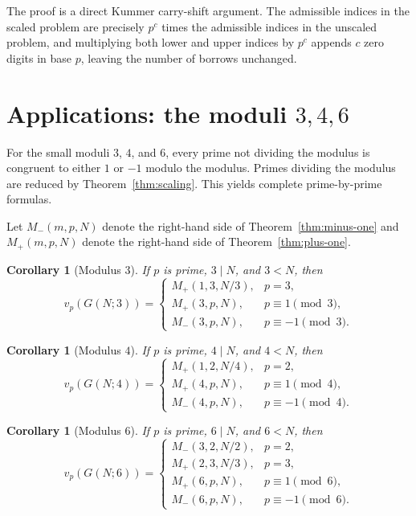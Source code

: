 \documentclass[11pt]{article}
\newtheorem{corollary}[theorem]{Corollary}
\begin{document}
The proof is a direct Kummer carry-shift argument.  The admissible indices in the
scaled problem are precisely $p^c$ times the admissible indices in the unscaled
problem, and multiplying both lower and upper indices by $p^c$ appends $c$ zero
digits in base $p$, leaving the number of borrows unchanged.

\section{Applications: the moduli \texorpdfstring{$3,4,6$}{3,4,6}}\label{sec:small}

For the small moduli $3$, $4$, and $6$, every prime not dividing the modulus is
congruent to either $1$ or $-1$ modulo the modulus.  Primes dividing the modulus
are reduced by Theorem~\ref{thm:scaling}.  This yields complete prime-by-prime
formulas.

Let $M_-(m,p,N)$ denote the right-hand side of
Theorem~\ref{thm:minus-one} and $M_+(m,p,N)$ denote the right-hand side of
Theorem~\ref{thm:plus-one}.

\begin{corollary}[Modulus $3$]\label{cor:m3}
If $p$ is prime, $3\mid N$, and $3<N$, then
\[
  v_p(G(N;3))=
  \begin{cases}
  M_+(1,3,N/3),& p=3,\\
  M_+(3,p,N),& p\equiv 1\pmod 3,\\
  M_-(3,p,N),& p\equiv -1\pmod 3.
  \end{cases}
\]
\end{corollary}

\begin{corollary}[Modulus $4$]\label{cor:m4}
If $p$ is prime, $4\mid N$, and $4<N$, then
\[
  v_p(G(N;4))=
  \begin{cases}
  M_+(1,2,N/4),& p=2,\\
  M_+(4,p,N),& p\equiv 1\pmod 4,\\
  M_-(4,p,N),& p\equiv -1\pmod 4.
  \end{cases}
\]
\end{corollary}

\begin{corollary}[Modulus $6$]\label{cor:m6}
If $p$ is prime, $6\mid N$, and $6<N$, then
\[
  v_p(G(N;6))=
  \begin{cases}
  M_-(3,2,N/2),& p=2,\\
  M_+(2,3,N/3),& p=3,\\
  M_+(6,p,N),& p\equiv 1\pmod 6,\\
  M_-(6,p,N),& p\equiv -1\pmod 6.
  \end{cases}
\]
\end{corollary}
\end{document}
